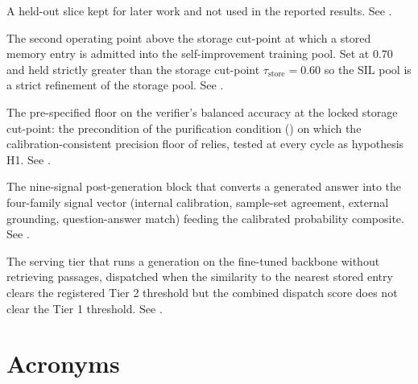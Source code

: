 \begin{description}[style=nextline, leftmargin=0pt, labelindent=0pt, itemsep=6pt, parsep=0pt, font=\bfseries, beginpenalty=10000]
\item[Test fold:] A held-out slice kept for later work and not used in the reported results. See .

\item[Training-pool admission threshold (\boldmath$\tau_{\text{train}}$):] The second operating point above the storage cut-point at which a stored memory entry is admitted into the self-improvement training pool. Set at $0.70$ and held strictly greater than the storage cut-point $\tau_{\text{store}} = 0.60$ so the SIL pool is a strict refinement of the storage pool. See .

\item[Verifier-balanced-accuracy precondition:] The pre-specified floor on the verifier's balanced accuracy at the locked storage cut-point: the precondition of the purification condition () on which the calibration-consistent precision floor of  relies, tested at every cycle as hypothesis H1. See .

\item[Verifier ensemble:] The nine-signal post-generation block that converts a generated answer into the four-family signal vector (internal calibration, sample-set agreement, external grounding, question-answer match) feeding the calibrated probability composite. See .

\item[Zero-shot tier (Tier 2):] The serving tier that runs a generation on the fine-tuned backbone without retrieving passages, dispatched when the similarity to the nearest stored entry clears the registered Tier 2 threshold but the combined dispatch score does not clear the Tier 1 threshold. See .

\end{description}

\section{Acronyms}


